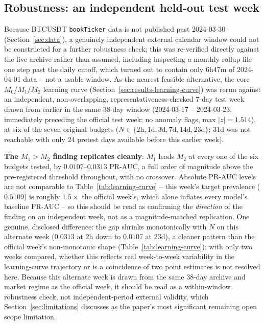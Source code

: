 \subsection{Robustness: an independent held-out test week}
\label{sec:results-robustness}

Because BTCUSDT \texttt{bookTicker} data is not published past
2024-03-30 (Section~\ref{sec:data}), a genuinely independent external
calendar window could not be constructed for a further robustness check;
this was re-verified directly against the live archive rather than
assumed, including inspecting a monthly rollup file one step past the
daily cutoff, which turned out to contain only 6h47m of 2024-04-01 data --
not a usable window. As the nearest feasible alternative, the core
$M_0$/$M_1$/$M_2$ learning curve (Section~\ref{sec:results-learning-curve})
was rerun against an independent, non-overlapping, representativeness-checked
7-day test week drawn from earlier in the same 38-day window
(2024-03-17 -- 2024-03-23, immediately preceding the official test week;
no anomaly flags, max $|z|=1.514$), at six of the seven original budgets
($N \in \{2\text{h},1\text{d},3\text{d},7\text{d},14\text{d},23\text{d}\}$;
$31$d was not reachable with only 24 pretest days available before this
earlier week).

\textbf{The $M_1 > M_2$ finding replicates cleanly}: $M_1$ leads $M_2$ at
every one of the six budgets tested, by $0.0107$--$0.0313$ PR-AUC, a full
order of magnitude above the pre-registered threshold throughout, with no
crossover. Absolute PR-AUC levels are not comparable to
Table~\ref{tab:learning-curve} -- this week's target prevalence
($0.5109$) is roughly $1.5\times$ the official week's, which alone
inflates every model's baseline PR-AUC -- so this should be read as
confirming the \emph{direction} of the finding on an independent week,
not as a magnitude-matched replication. One genuine, disclosed
difference: the gap shrinks monotonically with $N$ on this alternate
week ($0.0313$ at 2h down to $0.0107$ at 23d), a cleaner pattern than the
official week's non-monotonic shape (Table~\ref{tab:learning-curve});
with only two weeks compared, whether this reflects real week-to-week
variability in the learning-curve trajectory or is a coincidence of two
point estimates is not resolved here. Because this alternate week is
drawn from the same 38-day archive and market regime as the official
week, it should be read as a within-window robustness check, not
independent-period external validity, which Section~\ref{sec:limitations}
discusses as the paper's most significant remaining open scope
limitation.

